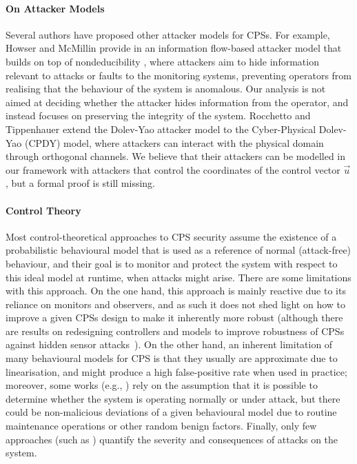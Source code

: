 {{{\paragraph{On Attacker Models} Several authors have proposed other attacker models for CPSs. For example, Howser and McMillin provide in \cite{StuxnetOnCPS} an information flow-based attacker model that builds on top of nondeducibility \cite{Nondeducibility}, where attackers aim to hide information relevant to attacks or faults to the monitoring systems, preventing operators from realising that the behaviour of the system is anomalous. Our analysis is not aimed at deciding whether the attacker hides information from the operator, and instead focuses on preserving the integrity of the system. Rocchetto and Tippenhauer \cite{CPSDolevYao} extend the Dolev-Yao attacker model \cite{DolevYao} to the Cyber-Physical Dolev-Yao (CPDY) model, where attackers can interact with the physical domain through orthogonal channels. We believe that their attackers can be modelled in our framework with attackers that control the coordinates of the control vector $\vec{u}$, but a formal proof is still missing.
}

\paragraph{Control Theory} 
Most control-theoretical approaches to CPS security assume the existence of a probabilistic behavioural model that is used as a reference of normal (attack-free) behaviour, and their goal is to monitor and protect the system with respect to this ideal model at runtime, when attacks might arise. There are some limitations with this approach. On the one hand, this approach is mainly reactive due to its reliance on monitors and observers, and as such it does not shed light on how to improve a given CPSs design to make it inherently more robust (although there are results on {redesigning controllers and models} to improve robustness of CPSs against hidden sensor attacks~\cite{ReachableSets,Weerakkody}). On the other hand, an inherent limitation of many behavioural models for CPS is that they usually are approximate due to linearisation, and might produce a high false-positive rate when used in practice; moreover, some works (e.g., \cite{Urbina2016,CPSDetectingIntegrityAttacksScada,IFCPSSec}) rely on the assumption that it is possible to determine whether the system is operating normally or under attack, but there could be non-malicious deviations of a given behavioural model due to routine maintenance operations or other random benign factors. Finally, only few approaches (such as \cite{IFCPSSec,Gupta2,ReachableSets}) quantify the severity and consequences of attacks on the system. 

}}
